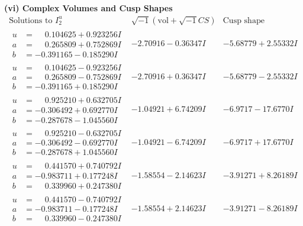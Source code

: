 \documentclass[1p]{elsarticle_modified}
\theoremstyle{definition}
\newcommand{\I}{\sqrt{-1}}
\begin{document}
\newpage\flushleft \textbf{(vi) Complex Volumes and Cusp Shapes}
$$\begin{array}{c|c|c}  
\text{Solutions to }I^u_{2}& \I (\text{vol} + \sqrt{-1}CS) & \text{Cusp shape}\\
 \hline 
\begin{aligned}
u &= \phantom{-}0.104625 + 0.923256 I \\
a &= \phantom{-}0.265809 + 0.752869 I \\
b &= -0.391165 - 0.185290 I\end{aligned}
 & -2.70916 - 0.36347 I & -5.68779 + 2.55332 I \\ \hline\begin{aligned}
u &= \phantom{-}0.104625 - 0.923256 I \\
a &= \phantom{-}0.265809 - 0.752869 I \\
b &= -0.391165 + 0.185290 I\end{aligned}
 & -2.70916 + 0.36347 I & -5.68779 - 2.55332 I \\ \hline\begin{aligned}
u &= \phantom{-}0.925210 + 0.632705 I \\
a &= -0.306492 + 0.692770 I \\
b &= -0.287678 - 1.045560 I\end{aligned}
 & -1.04921 + 6.74209 I & -6.9717 - 17.6770 I \\ \hline\begin{aligned}
u &= \phantom{-}0.925210 - 0.632705 I \\
a &= -0.306492 - 0.692770 I \\
b &= -0.287678 + 1.045560 I\end{aligned}
 & -1.04921 - 6.74209 I & -6.9717 + 17.6770 I \\ \hline\begin{aligned}
u &= \phantom{-}0.441570 + 0.740792 I \\
a &= -0.983711 + 0.177248 I \\
b &= \phantom{-}0.339960 + 0.247380 I\end{aligned}
 & -1.58554 - 2.14623 I & -3.91271 + 8.26189 I \\ \hline\begin{aligned}
u &= \phantom{-}0.441570 - 0.740792 I \\
a &= -0.983711 - 0.177248 I \\
b &= \phantom{-}0.339960 - 0.247380 I\end{aligned}
 & -1.58554 + 2.14623 I & -3.91271 - 8.26189 I \\ \hline\begin{aligned}

\end{aligned}
\end{array}$$
\end{document}
